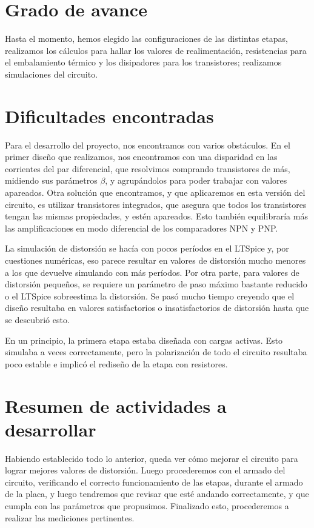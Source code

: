 \documentclass[a4paper,12pt,twoside]{article}
\begin{document}
\section{Grado de avance}

Hasta el momento, hemos elegido las configuraciones de las distintas etapas, realizamos los cálculos para hallar los valores de realimentación, resistencias para el embalamiento térmico y los disipadores para los transistores; realizamos simulaciones del circuito.

\section{Dificultades encontradas}


Para el desarrollo del proyecto, nos encontramos con varios obstáculos. En el primer diseño que realizamos, nos encontramos con una disparidad en las corrientes del par diferencial, que resolvimos comprando transistores de más, midiendo sus parámetros $\beta$, y agrupándolos para poder trabajar con valores apareados. Otra solución que encontramos, y que aplicaremos en esta versión del circuito, es utilizar transistores integrados, que asegura que todos los transistores tengan las mismas propiedades, y estén apareados. Esto también equilibraría más las amplificaciones en modo diferencial de los comparadores NPN y PNP.

La simulación de distorsión se hacía con pocos períodos en el LTSpice y, por cuestiones numéricas, eso parece resultar en valores de distorsión mucho menores a los que devuelve simulando con más períodos. Por otra parte, para valores de distorsión pequeños, se requiere un parámetro de paso máximo bastante reducido o el LTSpice sobreestima la distorsión. Se pasó mucho tiempo creyendo que el diseño resultaba en valores satisfactorios o insatisfactorios de distorsión hasta que se descubrió esto.

En un principio, la primera etapa estaba diseñada con cargas activas. Esto simulaba a veces correctamente, pero la polarización de todo el circuito resultaba poco estable e implicó el rediseño de la etapa con resistores.


\section{Resumen de actividades a desarrollar}

Habiendo establecido todo lo anterior, queda ver cómo mejorar el circuito para lograr mejores valores de distorsión. Luego procederemos con el armado del circuito, verificando el correcto funcionamiento de las etapas, durante el armado de la placa, y luego tendremos que revisar que esté andando correctamente, y que cumpla con las parámetros que propusimos. Finalizado esto, procederemos a realizar las mediciones pertinentes.
\end{document}

